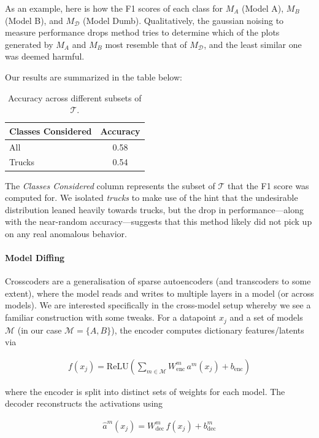 \documentclass[letterpaper]{article} %
\begin{document}
As an example, here is how the F1 scores of each class for $M_A$ (Model A), $M_B$ (Model B),  and $M_\mathcal{D}$ (Model Dumb). Qualitatively, the gaussian noising to measure performance drops method tries to determine which of the plots generated by $M_A$ and $M_B$ most resemble that of $M_\mathcal{D}$, and the least similar one was deemed harmful.

Our results are summarized in the table below:

\begin{table}[h]
\centering
\begin{tabular}{|l|c|}
\hline
\textbf{Classes Considered} & \textbf{Accuracy} \\
\hline
All & 0.58 \\
Trucks & 0.54 \\
\hline
\end{tabular}
\caption{Accuracy across different subsets of $\mathcal{T}$.}
\end{table}

The \textit{Classes Considered} column represents the subset of $\mathcal{T}$ that the F1 score was computed for. We isolated \textit{trucks} to make use of the hint that the undesirable distribution leaned heavily towards trucks, but the drop in performance---along with the near-random accuracy---suggests that this method likely did not pick up on any real anomalous behavior.

\paragraph{Model Diffing}
Crosscoders are a generalisation of sparse autoencoders (and transcoders to some extent), where the model reads and writes to multiple layers in a model (or across models). We are interested specifically in the cross-model setup whereby we see a familiar construction with some tweaks. For a datapoint $x_j$ and a set of models $\mathcal{M}$ (in our case $\mathcal{M} = \{ A, B \}$), the encoder computes dictionary features/latents via

\begin{align}
f(x_j) = \text{ReLU}\left(\sum\limits_{m \in \mathcal{M}} W^m_{\text{enc}}\, a^m(x_j) + b_{\text{enc}} \right)
\end{align}

where the encoder is split into distinct sets of weights for each model. The decoder reconstructs the activations using

\begin{align}
\hat{a}^{m}(x_j) = W^m_{\text{dec}}\, f(x_j) + b^m_{\text{dec}}
\end{align}
\end{document}
